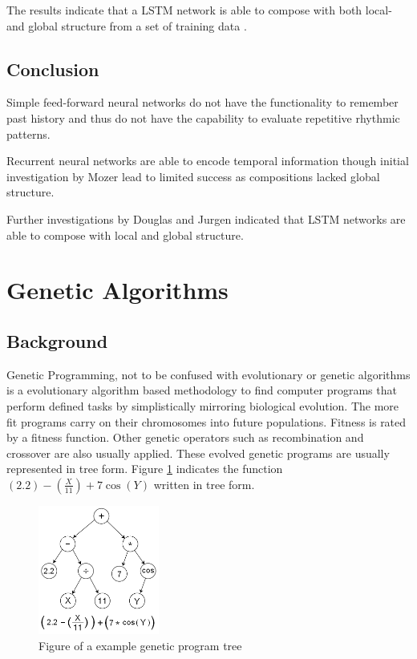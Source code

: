 The results indicate that a \ac{LSTM} network is able to compose with both local- and global structure from a set of training data \cite{Eck2002}.


\subsection{Conclusion}

Simple feed-forward neural networks do not have the functionality to remember past history and thus do not have the capability to evaluate repetitive rhythmic patterns.

Recurrent neural networks are able to encode temporal information though initial investigation by Mozer lead to limited success as compositions lacked global structure. 

Further investigations by Douglas and Jurgen indicated that \ac{LSTM} networks are able to compose with local and global structure.

\section{Genetic Algorithms}
\subsection{Background}

Genetic Programming, not to be confused with evolutionary or genetic algorithms is a evolutionary algorithm based methodology to find computer programs that perform defined tasks by simplistically mirroring biological evolution.
The more fit programs carry on their chromosomes into future populations. Fitness is rated by a fitness function. Other genetic operators such as recombination and crossover are also usually applied. 
These evolved genetic programs are usually represented in tree form. Figure \ref{ims:gpt} indicates the function $ (2.2) - (\frac{X}{11}) + 7\cos(Y)$ written in tree form.
\begin{figure}[!bh]
\centerline{\includegraphics[width=150px]{../images/gpt.png}}
\caption{Figure of a example genetic program tree}
\label{ims:gpt}
\end{figure}

